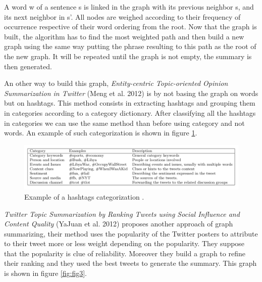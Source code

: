 \documentclass{llncs}
\begin{document}
A word w of a sentence s is linked in the graph with its previous neighbor s,
and its next neighbor in s'. All nodes are weighed according to their frequency
of occurrence respective of their word ordering from the root. Now that the
graph is built, the algorithm has to find the most weighted path and then build
a new graph using the same way putting the phrase resulting to this path as the
root of the new graph. It will be repeated until the graph is not empty, the
summary is then generated.

An other way to build this graph, \textit{Entity-centric Topic-oriented Opinion
Summarization in Twitter} (Meng et al. 2012) \cite{meng_entity-centric_2012} is
by not basing the graph on words but on hashtags. This method consists in
extracting hashtags and grouping them in categories according to a category
dictionary. After classifying all the hashtags in categories we can use the
same method than before using category and not words. An example of such
categorization is shown in figure \ref{fig:fig2}.

\begin{figure}[H]
    \includegraphics[width=\textwidth]{fig2.png}
    \caption{Example of a hashtags categorization
    \cite{meng_entity-centric_2012}.}
    \label{fig:fig2}
\end{figure}

\textit{Twitter Topic Summarization by Ranking Tweets using Social Influence
and Content Quality} (YaJuan et al. 2012) \cite{duan_twitter_2012} proposes
another approach of graph summarizing, their method uses the popularity of the
Twitter posters to attribute to their tweet more or less weight depending on
the popularity. They suppose that the popularity is clue of reliability.
Moreover they build a graph to refine their ranking and they used the best
tweets to generate the summary. This graph is shown in figure \ref{fig:fig3}.
\end{document}
